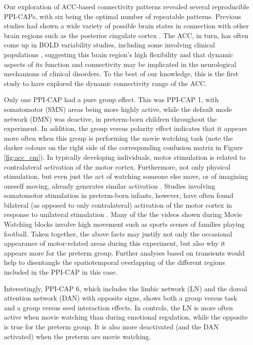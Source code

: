 Our exploration of ACC-based connectivity patterns revealed several reproducible PPI-CAPs, with six being the optimal number of repeatable patterns. Previous studies had shown a wide variety of possible brain states in connection with other brain regions such as the posterior cingulate cortex \citep{Liu2013a,Lin2017,Freitas2020}. The ACC, in turn, has often come up in BOLD variability studies, including some involving clinical populations \citep{Zoller2017,Zhang2020}, suggesting this brain region's high flexibility and that dynamic aspects of its function and connectivity may be implicated in the neurological mechanisms of clinical disorders. To the best of our knowledge, this is the first study to  have explored the dynamic connectivity range of the ACC.


Only one PPI-CAP had a pure group effect. This was PPI-CAP 1, with somatomotor (SMN) areas being more highly active, while the default mode network (DMN) was deactive, in preterm-born children throughout the experiment. In addition, the group versus polarity effect indicates that it appears more often when this group is performing the movie watching task (note the darker colours on the right side of the corresponding confusion matrix in Figure \ref{fig:acc_cm}). In typically developing individuals, motor stimulation is related to contralateral activation of the motor cortex. Furthermore, not only physical stimulation, but even just the act of watching someone else move, or of imagining oneself moving, already generates similar activation \citep{Butler2006}. Studies involving somatomotor stimulation in preterm-born infants, however, have often found bilateral (as opposed to only contralateral) activation of the motor cortex in response to unilateral stimulation \citep{Heep2009a,Arichi2010,Allievi2016}. Many of the the videos shown during Movie Watching blocks involve high movement such as sports scenes of families playing football. Taken together, the above facts may justify not only the occasional appearance of motor-related areas during this experiment, but also why it appears more for the preterm group. Further analyses based on transients \citep{Karahanoglu2015a,Freitas2020} would help to disentangle the spatiotemporal overlapping of the different regions included in the PPI-CAP in this case.

Interestingly, PPI-CAP 6, which includes the limbic network (LN) and the dorsal attention network (DAN) with opposite signs, shows both a group versus task and a group versus seed interaction effects. In controls, the LN is more often active when movie watching than during emotional regulation, while the opposite is true for the preterm group. It is also more deactivated (and the DAN activated) when the preterm are movie watching. 


